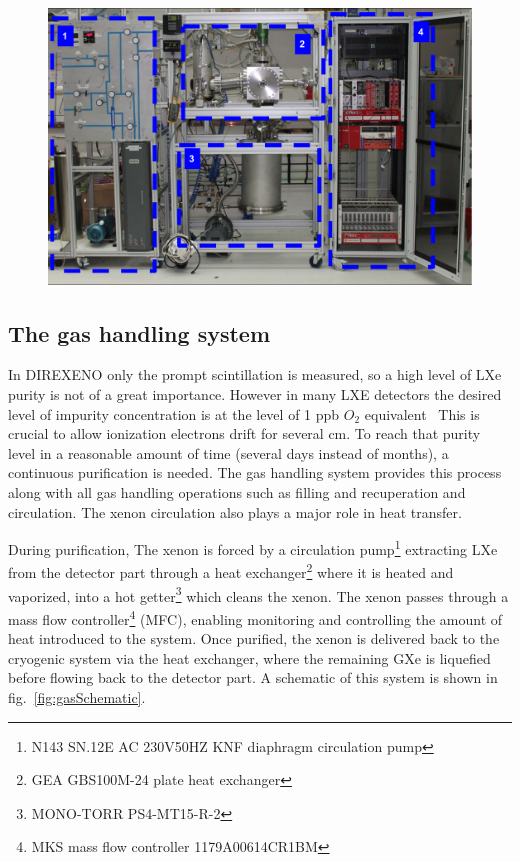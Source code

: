 \begin{figure}[h]
\centerline{\includegraphics[width=0.8\linewidth]{fig/FullSys.png}}
\end{figure}



\subsection{The gas handling system}
\label{subsec:gas}

In DIREXENO only the prompt scintillation is measured, so a high level of LXe purity is not of a great importance. However in many LXE detectors the desired level of impurity concentration is at the level of 1 ppb $O_2$ equivalent~\cite{Aprile:2009dv} This is crucial to allow 
ionization electrons drift for several cm. To reach that purity level in a reasonable amount 
of time (several days instead of months), 
a continuous purification is needed. The gas handling system provides this process along 
with all gas handling operations such as filling and recuperation and circulation. The xenon circulation also plays a major role in heat transfer.


During purification, The xenon is forced by a circulation pump\footnote{N143 SN.12E AC 230V50HZ KNF diaphragm circulation pump} extracting LXe from the detector part through a heat exchanger\footnote{GEA GBS100M-24 plate heat exchanger} 
where it is heated and vaporized, into a hot getter\footnote{MONO-TORR PS4-MT15-R-2} which cleans the xenon. The xenon passes through a mass flow controller\footnote{MKS mass flow controller 1179A00614CR1BM} (MFC), 
enabling monitoring and controlling the amount of heat introduced to the system.  Once purified, the xenon is delivered back to the cryogenic system 
via the heat exchanger, where the remaining GXe is 
liquefied before flowing back to the detector part. A schematic of this 
system is shown in fig.~\ref{fig:gasSchematic}.


